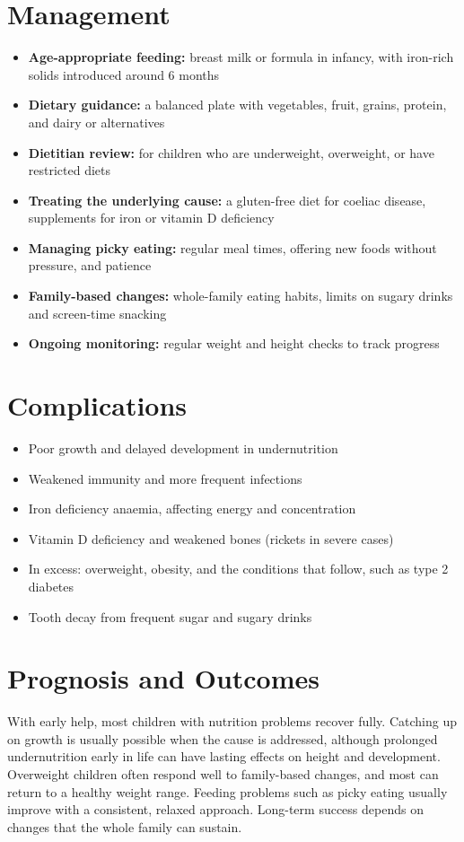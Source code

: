 \section*{Management}
\begin{itemize}
    \item \textbf{Age-appropriate feeding:} breast milk or formula in infancy, with iron-rich solids introduced around 6 months
    \item \textbf{Dietary guidance:} a balanced plate with vegetables, fruit, grains, protein, and dairy or alternatives
    \item \textbf{Dietitian review:} for children who are underweight, overweight, or have restricted diets
    \item \textbf{Treating the underlying cause:} a gluten-free diet for coeliac disease, supplements for iron or vitamin D deficiency
    \item \textbf{Managing picky eating:} regular meal times, offering new foods without pressure, and patience
    \item \textbf{Family-based changes:} whole-family eating habits, limits on sugary drinks and screen-time snacking
    \item \textbf{Ongoing monitoring:} regular weight and height checks to track progress
\end{itemize}

\section*{Complications}
\begin{itemize}
    \item Poor growth and delayed development in undernutrition
    \item Weakened immunity and more frequent infections
    \item Iron deficiency anaemia, affecting energy and concentration
    \item Vitamin D deficiency and weakened bones (rickets in severe cases)
    \item In excess: overweight, obesity, and the conditions that follow, such as type 2 diabetes
    \item Tooth decay from frequent sugar and sugary drinks
\end{itemize}

\section*{Prognosis and Outcomes}
With early help, most children with nutrition problems recover fully. Catching up on growth is usually possible when the cause is addressed, although prolonged undernutrition early in life can have lasting effects on height and development. Overweight children often respond well to family-based changes, and most can return to a healthy weight range. Feeding problems such as picky eating usually improve with a consistent, relaxed approach. Long-term success depends on changes that the whole family can sustain.

